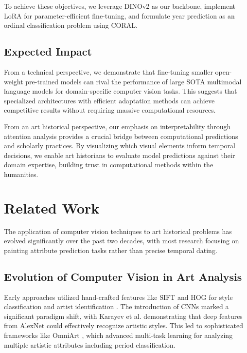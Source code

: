 \documentclass[10pt,twocolumn,letterpaper]{article}
\begin{document}
To achieve these objectives, we leverage DINOv2 as our backbone, implement LoRA for parameter-efficient fine-tuning, and formulate year prediction as an ordinal classification problem using CORAL.

\subsection{Expected Impact}

From a technical perspective, we demonstrate that fine-tuning smaller open-weight pre-trained models can rival the performance of large SOTA multimodal language models for domain-specific computer vision tasks. This suggests that specialized architectures with efficient adaptation methods can achieve competitive results without requiring massive computational resources.

From an art historical perspective, our emphasis on interpretability through attention analysis provides a crucial bridge between computational predictions and scholarly practices. By visualizing which visual elements inform temporal decisions, we enable art historians to evaluate model predictions against their domain expertise, building trust in computational methods within the humanities.

\section{Related Work}

The application of computer vision techniques to art historical problems has evolved significantly over the past two decades, with most research focusing on painting attribute prediction tasks rather than precise temporal dating.

\subsection{Evolution of Computer Vision in Art Analysis}

Early approaches utilized hand-crafted features like SIFT and HOG for style classification and artist identification \cite{Karayev14}. The introduction of CNNs marked a significant paradigm shift, with Karayev et al. demonstrating that deep features from AlexNet could effectively recognize artistic styles. This led to sophisticated frameworks like OmniArt \cite{Strezoski17OmniArt, Strezoski18}, which advanced multi-task learning for analyzing multiple artistic attributes including period classification.
\end{document}
